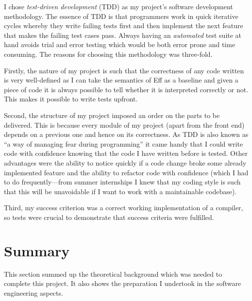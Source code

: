 \documentclass[class=article, crop=false]{standalone}
\begin{document}
I chose \emph{test-driven development} (TDD) \cite{beck2003test} as my project's
software development methodology. The essence of TDD is that programmers work in
quick iterative cycles whereby they write failing tests first and then implement
the next feature that makes the failing test cases pass. Always having an
\emph{automated} test suite at hand avoids trial and error testing which would
be both error prone and time consuming. The reasons for choosing this
methodology was three-fold.

Firstly, the nature of my project is such that the correctness of any code
written is very well-defined as I can take the semantics of Eff as a baseline
and given a piece of code it is always possible to tell whether it is
interpreted correctly or not. This makes it possible to write tests upfront.

Second, the structure of my project imposed an order on the parts to be
delivered. This is because every module of my project (apart from the front end)
depends on a previous one and hence on its correctness. As TDD is also known as 
``a way of managing fear during programming'' it came handy that I could write
code with confidence knowing that the code I have written before is tested.
Other advantages were the ability to notice quickly if a code change broke some
already implemented feature and the ability to refactor code with confidence
(which I had to do frequently---from summer internships I knew that my coding
style is such that this will be unavoidable if I want to work with a
maintainable codebase).

Third, my success criterion was a correct working implementation of a compiler,
so tests were crucial to demonstrate that success criteria were fulfilled.

\section{Summary}
This section summed up the theoretical background which was needed to complete
this project. It also shows the preparation I undertook in the software
engineering aspects.
\end{document}
